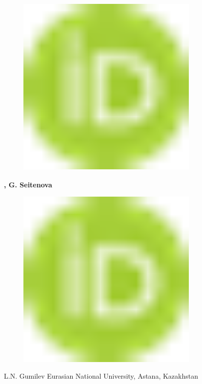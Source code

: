 \begin{figure}[H]
	\centering
	\includegraphics[width=0.8\textwidth]{media/chem2/image1}
	\caption*{}
\end{figure}
{\bfseries \textsuperscript{\envelope },
G.
Seitenova}
\begin{figure}[H]
	\centering
	\includegraphics[width=0.8\textwidth]{media/chem2/image1}
	\caption*{}
\end{figure}
{\bfseries \textsuperscript{\envelope }}

L.N. Gumilev Eurasian National University, Astana, Kazakhstan

